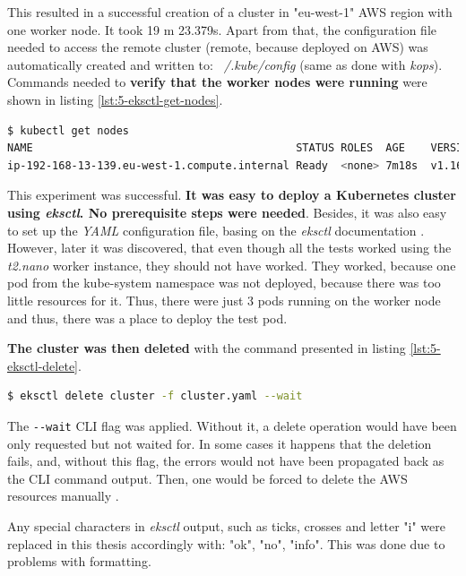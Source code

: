 This resulted in a successful creation of a cluster in "eu-west-1" AWS region with one worker node. It took 19 m 23.379s. Apart from that, the configuration file needed to access the remote cluster (remote, because deployed on AWS) was automatically created and written to: \textit{~/.kube/config} (same as done with \textit{kops}). Commands needed to \textbf{verify that the worker nodes were running} were shown in listing \ref{lst:5-eksctl-get-nodes}.
\begin{lstlisting}[basicstyle=\scriptsize,xleftmargin=0cm,caption={Command used to list Kubernetes worker nodes to verify that one such node was running},captionpos=b,language=Bash,label=lst:5-eksctl-get-nodes]
$ kubectl get nodes
NAME                                         STATUS ROLES  AGE    VERSION
ip-192-168-13-139.eu-west-1.compute.internal Ready  <none> 7m18s  v1.16.8-eks-e16311
\end{lstlisting}

This experiment was successful. \textbf{It was easy to deploy a Kubernetes cluster using \textit{eksctl}. No prerequisite steps were needed}. Besides, it was also easy to set up the \textit{YAML} configuration file, basing on the \textit{eksctl} documentation \cite{eksctl-creating-clusters}. However, later it was discovered, that even though all the tests worked using the \textit{t2.nano} worker instance, they should not have worked. They worked, because one pod from the kube-system namespace was not deployed, because there was too little resources for it. Thus, there were just 3 pods running on the worker node and thus, there was a place to deploy the test pod.


\textbf{The cluster was then deleted} with the command presented in listing \ref{lst:5-eksctl-delete}.
\begin{lstlisting}[basicstyle=\scriptsize,xleftmargin=0cm,caption={Command used to delete Kubernetes cluster with \textit{eksctl}},captionpos=b,language=Bash,label=lst:5-eksctl-delete]
$ eksctl delete cluster -f cluster.yaml --wait
\end{lstlisting}

The \verb|--wait| CLI flag was applied. Without it, a delete operation would have been only requested but not waited for. In some cases it happens that the deletion fails, and, without this flag, the errors would not have been propagated back as the CLI command output. Then, one would be forced to delete the AWS resources manually \cite{eksctl-creating-clusters}.

Any special characters in \textit{eksctl} output, such as ticks, crosses and letter "i" were replaced in this thesis accordingly with: "ok", "no", "info". This was done due to problems with formatting.

